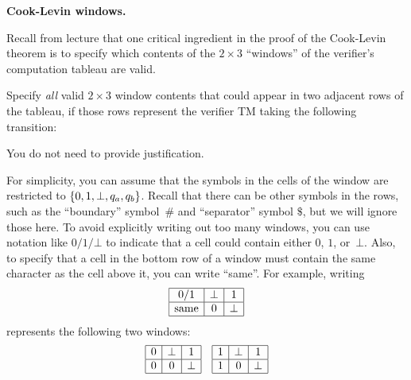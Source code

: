 \documentclass[11pt,addpoints]{exam}
\begin{document}
\begin{questions}
  \question[10] \textbf{Cook-Levin windows.}

  Recall from lecture that one critical ingredient in the proof of the Cook-Levin theorem is to specify which contents of the $2\times 3$ ``windows'' of the verifier's computation tableau are valid.

  Specify \emph{all} valid $2 \times 3$ window contents that could appear in two adjacent rows of the tableau, if those rows represent the verifier TM taking the following transition:
  \begin{center}
  \end{center}
  You do not need to provide justification.

  For simplicity, you can assume that the symbols in the cells of the window are restricted to $\{0, 1, \bot,q_a,q_b\}$.
  Recall that there can be other symbols in the rows, such as the ``boundary'' symbol~$\#$ and ``separator'' symbol $\$$, but we will ignore those here.
  To avoid explicitly writing out too many windows, you can use notation like $0/1/\bot$ to indicate that a cell could contain either $0$, $1$, or~$\bot$.
  Also, to specify that a cell in the bottom row of a window must contain the same character as the cell above it, you can write ``same''.
  For example, writing
  \[\begin{array}{|c|c|c|}
      \hline
      0/1 & \bot & 1 \\
      \hline
      \text{same} & 0 & \bot \\
      \hline
    \end{array}
  \]
  represents the following two windows:
  \[
  \begin{array}{|c|c|c|}
      \hline
      0 & \bot & 1 \\
      \hline
      0 & 0 & \bot \\
      \hline
    \end{array}
  \quad
  \begin{array}{|c|c|c|}
      \hline
      1 & \bot & 1 \\
      \hline
      1 & 0 & \bot \\
      \hline
  \end{array}
  \]
  

\end{questions}
\end{document}
